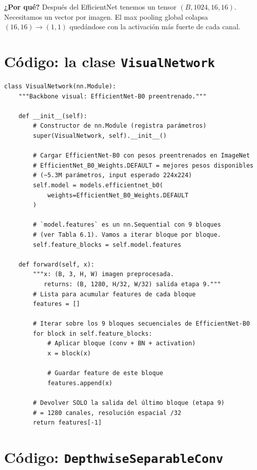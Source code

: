 \noindent\textbf{¿Por qué?} Después del EfficientNet tenemos un
tensor $(B, 1024, 16, 16)$. Necesitamos un vector por imagen. El
max pooling global colapsa $(16, 16) \to (1, 1)$ quedándose con la
activación más fuerte de cada canal.

\section{Código: la clase \texttt{VisualNetwork}}

\begin{verbatim}
class VisualNetwork(nn.Module):
    """Backbone visual: EfficientNet-B0 preentrenado."""

    def __init__(self):
        # Constructor de nn.Module (registra parámetros)
        super(VisualNetwork, self).__init__()

        # Cargar EfficientNet-B0 con pesos preentrenados en ImageNet
        # EfficientNet_B0_Weights.DEFAULT = mejores pesos disponibles
        # (~5.3M parámetros, input esperado 224x224)
        self.model = models.efficientnet_b0(
            weights=EfficientNet_B0_Weights.DEFAULT
        )

        # `model.features` es un nn.Sequential con 9 bloques
        # (ver Tabla 6.1). Vamos a iterar bloque por bloque.
        self.feature_blocks = self.model.features

    def forward(self, x):
        """x: (B, 3, H, W) imagen preprocesada.
           returns: (B, 1280, H/32, W/32) salida etapa 9."""
        # Lista para acumular features de cada bloque
        features = []

        # Iterar sobre los 9 bloques secuenciales de EfficientNet-B0
        for block in self.feature_blocks:
            # Aplicar bloque (conv + BN + activation)
            x = block(x)

            # Guardar feature de este bloque
            features.append(x)

        # Devolver SOLO la salida del último bloque (etapa 9)
        # = 1280 canales, resolución espacial /32
        return features[-1]
\end{verbatim}

\section{Código: \texttt{DepthwiseSeparableConv}}

